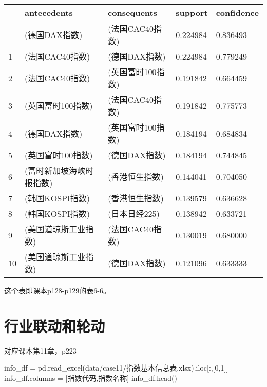 \documentclass[
  letterpaper,
  DIV=11,
  numbers=noendperiod]{scrreprt}
\newenvironment{Shaded}{\begin{snugshade}}{\end{snugshade}}
\newcommand{\DecValTok}[1]{\textcolor[rgb]{0.68,0.00,0.00}{#1}}
\newcommand{\NormalTok}[1]{\textcolor[rgb]{0.00,0.23,0.31}{#1}}
\newcommand{\OperatorTok}[1]{\textcolor[rgb]{0.37,0.37,0.37}{#1}}
\newcommand{\StringTok}[1]{\textcolor[rgb]{0.13,0.47,0.30}{#1}}
\begin{document}
\begin{longtable}[]{@{}lllll@{}}
\toprule\noalign{}
& antecedents & consequents & support & confidence \\
\midrule\noalign{}
\endhead
\bottomrule\noalign{}
\endlastfoot
0 & (德国DAX指数) & (法国CAC40指数) & 0.224984 & 0.836493 \\
1 & (法国CAC40指数) & (德国DAX指数) & 0.224984 & 0.779249 \\
2 & (法国CAC40指数) & (英国富时100指数) & 0.191842 & 0.664459 \\
3 & (英国富时100指数) & (法国CAC40指数) & 0.191842 & 0.775773 \\
4 & (德国DAX指数) & (英国富时100指数) & 0.184194 & 0.684834 \\
5 & (英国富时100指数) & (德国DAX指数) & 0.184194 & 0.744845 \\
6 & (富时新加坡海峡时报指数) & (香港恒生指数) & 0.144041 & 0.704050 \\
7 & (韩国KOSPI指数) & (香港恒生指数) & 0.139579 & 0.636628 \\
8 & (韩国KOSPI指数) & (日本日经225) & 0.138942 & 0.633721 \\
9 & (美国道琼斯工业指数) & (法国CAC40指数) & 0.130019 & 0.680000 \\
10 & (美国道琼斯工业指数) & (德国DAX指数) & 0.121096 & 0.633333 \\
\end{longtable}

这个表即课本p128-p129的表6-6。

\hypertarget{ux884cux4e1aux8054ux52a8ux548cux8f6eux52a8}{%
\section{行业联动和轮动}\label{ux884cux4e1aux8054ux52a8ux548cux8f6eux52a8}}

对应课本第11章，p223

\begin{Shaded}
\begin{Highlighting}[]
\NormalTok{info\_df }\OperatorTok{=}\NormalTok{ pd.read\_excel(}\StringTok{\textquotesingle{}data/case11/指数基本信息表.xlsx\textquotesingle{}}\NormalTok{).iloc[:,[}\DecValTok{0}\NormalTok{,}\DecValTok{1}\NormalTok{]]}
\NormalTok{info\_df.columns }\OperatorTok{=}\NormalTok{ [}\StringTok{\textquotesingle{}指数代码\textquotesingle{}}\NormalTok{,}\StringTok{\textquotesingle{}指数名称\textquotesingle{}}\NormalTok{]}
\NormalTok{info\_df.head()}
\end{Highlighting}
\end{Shaded}
\end{document}
